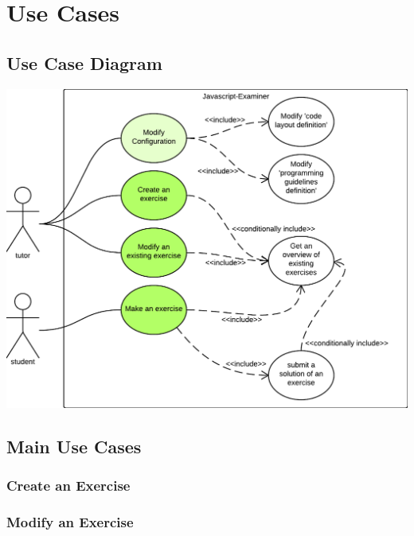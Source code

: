 \section{Use Cases}

\subsection{Use Case Diagram}
\includegraphics[scale=1.2]{diagrams-images/use-case-diagram}

\subsection{Main Use Cases}

\subsubsection{Create an Exercise}

\subsubsection{Modify an Exercise}


